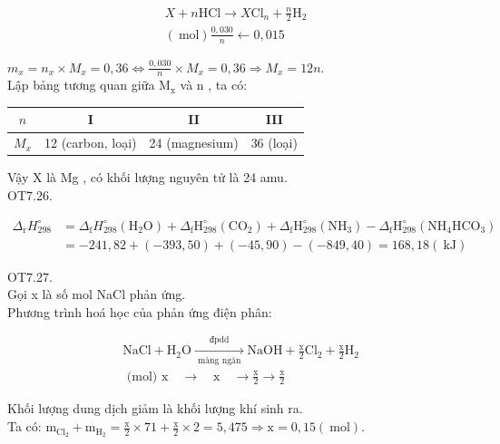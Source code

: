 \documentclass[10pt]{article}
\begin{document}
$$
\begin{gathered}
X+n \mathrm{HCl} \rightarrow X \mathrm{Cl}_{n}+\frac{n}{2} \mathrm{H}_{2} \\
(\mathrm{~mol}) \frac{0,030}{n} \leftarrow 0,015
\end{gathered}
$$

$m_{x}=n_{x} \times M_{x}=0,36 \Leftrightarrow \frac{0,030}{n} \times M_{x}=0,36 \Rightarrow M_{x}=12 n$.\\
Lập bảng tương quan giữa $\mathrm{M}_{\mathrm{x}}$ và n , ta có:

\begin{center}
\begin{tabular}{|c|c|c|c|}
\hline
$n$ & I & II & III \\
\hline
$M_{x}$ & 12 (carbon, loại) & 24 (magnesium) & 36 (loại) \\
\hline
\end{tabular}
\end{center}

Vậy X là Mg , có khối lượng nguyên tử là 24 amu.\\
OT7.26.

$$
\begin{aligned}
\Delta_{\mathrm{r}} H_{298}^{\circ} & =\Delta_{\mathrm{f}} H_{298}^{\circ}\left(\mathrm{H}_{2} \mathrm{O}\right)+\Delta_{\mathrm{f}} \mathrm{H}_{298}^{\circ}\left(\mathrm{CO}_{2}\right)+\Delta_{\mathrm{f}} \mathrm{H}_{298}^{\circ}\left(\mathrm{NH}_{3}\right)-\Delta_{\mathrm{f}} \mathrm{H}_{298}^{\circ}\left(\mathrm{NH}_{4} \mathrm{HCO}_{3}\right) \\
& =-241,82+(-393,50)+(-45,90)-(-849,40)=168,18(\mathrm{~kJ})
\end{aligned}
$$

OT7.27.\\
Gọi x là số mol NaCl phản ứng.\\
Phương trình hoá học của phản ứng điện phân:

$$
\begin{aligned}
& \mathrm{NaCl}+\mathrm{H}_{2} \mathrm{O} \xrightarrow[\text { màng ngăn }]{\text { đpdd }} \mathrm{NaOH}+\frac{\mathrm{x}}{2} \mathrm{Cl}_{2}+\frac{\mathrm{x}}{2} \mathrm{H}_{2} \\
& \text { (mol) } \mathrm{x} \quad \rightarrow \quad \mathrm{x} \quad \rightarrow \frac{\mathrm{x}}{2} \rightarrow \frac{\mathrm{x}}{2}
\end{aligned}
$$

Khối lượng dung dịch giảm là khối lượng khí sinh ra.\\
Ta có: $\mathrm{m}_{\mathrm{Cl}_{2}}+\mathrm{m}_{\mathrm{H}_{2}}=\frac{\mathrm{x}}{2} \times 71+\frac{\mathrm{x}}{2} \times 2=5,475 \Rightarrow \mathrm{x}=0,15(\mathrm{~mol})$.
\end{document}
